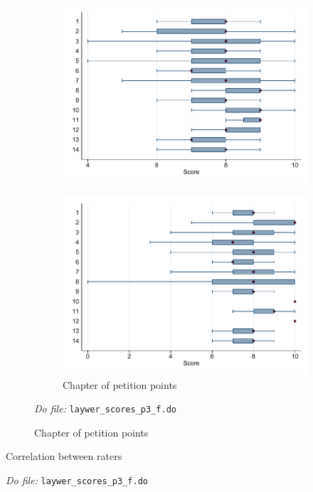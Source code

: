 \documentclass[oneside,11pt]{article}
\begin{document}
\begin{figure}[H]
\begin{center}
\begin{subfigure}{0.49\textwidth}
        \includegraphics[width=\textwidth]{Figuras/boxplot_calif_derechos.pdf}
    \end{subfigure}    
 \begin{subfigure}{0.49\textwidth}
        \caption{Chapter of petition points}
        \centering
        \includegraphics[width=\textwidth]{Figuras/boxplot_calif_puntos_petitorios.pdf}
    \end{subfigure}      
    \end{center}
    \scriptsize{ \noindent 
    \textit{Do file: }  \texttt{laywer\_scores\_p3\_f.do}}

\end{figure}


\begin{table}[H]
    \caption{Correlation between raters}
    \label{cor_reshape_subj}
    \begin{center}
    \scriptsize{}
    \end{center}
  \scriptsize{ \noindent 
    \textit{Do file: }  \texttt{laywer\_scores\_p3\_f.do}}
\end{table}
\end{document}
